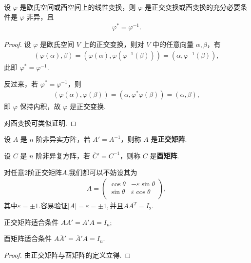 \documentclass[../../main.tex]{subfiles}%
\begin{document}
\begin{theorem}\label{theorem:正交变换或酉变换g关于伴随算子的充要条件}
设 $\varphi$ 是欧氏空间或酉空间上的线性变换，则 $\varphi$ 是正交变换或酉变换的充分必要条件是 $\varphi$ 非异，且
\begin{align*}
\varphi^* = \varphi^{-1}.
\end{align*}
\end{theorem}
\begin{proof}
设 $\varphi$ 是欧氏空间 $V$ 上的正交变换，则对 $V$ 中的任意向量 $\alpha,\beta$，有
\begin{align*}
(\varphi(\alpha),\beta) = (\varphi(\alpha),\varphi(\varphi^{-1}(\beta))) = (\alpha,\varphi^{-1}(\beta)),
\end{align*}
此即 $\varphi^* = \varphi^{-1}$.

反过来，若 $\varphi^* = \varphi^{-1}$，则
\begin{align*}
(\varphi(\alpha),\varphi(\beta)) = (\alpha,\varphi^*\varphi(\beta)) = (\alpha,\beta),
\end{align*}
即 $\varphi$ 保持内积，故 $\varphi$ 是正交变换.

对酉变换可类似证明.
\end{proof}

\begin{definition}[正交矩阵和酉矩阵]
设 $A$ 是 $n$ 阶非异实方阵，若 $A' = A^{-1}$，则称 $A$ 是\textbf{正交矩阵}. 

设 $C$ 是 $n$ 阶非异复方阵，若 $\overline{C}' = C^{-1}$，则称 $C$ 是\textbf{酉矩阵}.
\end{definition}
\begin{remark}
对任意2阶正交矩阵$A$,我们都可以不妨设其为
\begin{align*}
A=\left( \begin{matrix}
\cos \theta&		-\varepsilon \sin \theta\\
\sin \theta&		\varepsilon \cos \theta\\
\end{matrix} \right) ,
\end{align*}
其中$\varepsilon=\pm 1$.容易验证$|A|=\varepsilon =\pm 1,$并且$AA^T=I_2.$
\end{remark}

\begin{theorem}
正交矩阵适合条件 $AA' = A'A = I_n$;

酉矩阵适合条件 $A\overline{A}' = \overline{A}'A = I_n$.
\end{theorem}
\begin{proof}
由正交矩阵与酉矩阵的定义立得.
\end{proof}
\end{document}
